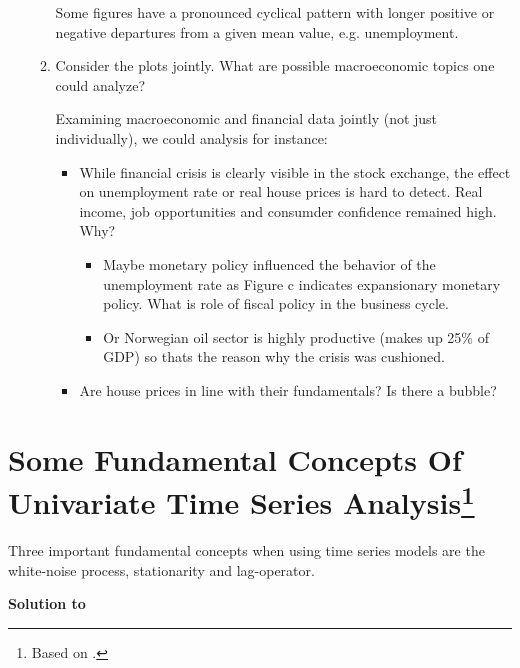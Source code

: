 \documentclass[a4paper]{scrartcl}
\begin{document}
\begin{enumerate}
\begin{enumerate}
\begin{solution}
			Some figures have a pronounced cyclical pattern with longer positive or negative departures from a given mean value, e.g. unemployment.
		\end{solution}
		\item Consider the plots jointly. What are possible macroeconomic topics one could analyze?
		\begin{solution}
			Examining macroeconomic and financial data jointly (not just individually), we could analysis for instance:
			\begin{itemize}
				\item While financial crisis is clearly visible in the stock exchange, the effect on unemployment rate or real house prices is hard to detect. Real income, job opportunities and consumder confidence remained high. Why?
				\begin{itemize} 
					\item Maybe monetary policy influenced the behavior of the unemployment rate as Figure c indicates expansionary monetary policy. What is role of fiscal policy in the business cycle.
					\item Or Norwegian oil sector is highly productive (makes up 25\% of GDP) so thats the reason why the crisis was cushioned.
				\end{itemize}
				\item Are house prices in line with their fundamentals? Is there a bubble?
			\end{itemize}
		\newpage
		\end{solution}
	\end{enumerate}
	
\end{enumerate}
\newpage

\section[Some Fundamental Concepts Of Univariate Time Series Analysis]{Some Fundamental Concepts Of Univariate Time Series Analysis\footnote{Based on \citet[Ch.~2]{BjornlandThorsrud.2015}.}}\label{ex:FundamentalConceptsUnivariateTSA}
Three important fundamental concepts when using time series models are the white-noise process, stationarity and lag-operator.
\begin{solution}\textbf{Solution to }
\end{solution}
\end{document}

